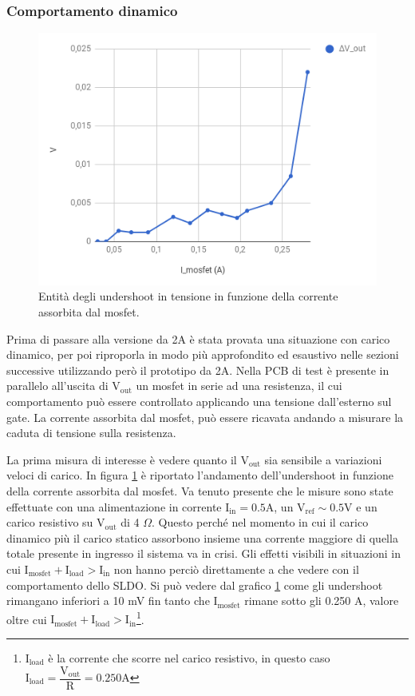 \subsubsection{Comportamento dinamico}
\begin{figure}
\centering
\includegraphics[scale=.5]{Immagini/SLDO5singlepulse}
\caption{Entità degli undershoot in tensione in funzione della corrente assorbita dal mosfet.}
\label{SLDO5singlepulse}
\end{figure}

Prima di passare alla versione da 2A è stata provata una situazione con carico dinamico, per poi riproporla in modo più approfondito ed esaustivo nelle sezioni successive utilizzando però il prototipo da 2A.
Nella PCB di test è presente in parallelo all'uscita di $\mathrm{V_{out}}$ un mosfet in serie ad una resistenza, il cui comportamento può essere controllato applicando una tensione dall'esterno sul gate. 
La corrente assorbita dal mosfet, può essere ricavata andando a misurare la caduta di tensione sulla resistenza. 

La prima misura di interesse è vedere quanto il $\mathrm{V_{out}}$ sia sensibile a variazioni veloci di carico. In figura \ref{SLDO5singlepulse} è riportato l'andamento dell'undershoot in funzione della corrente assorbita dal mosfet. Va tenuto presente che le misure sono state effettuate con una alimentazione in corrente $\mathrm{I_{in} = 0.5 A}$, un $\mathrm{V_{ref} \sim 0.5 V}$ e un carico resistivo su $\mathrm{V_{out}}$ di 4 $\Omega$. 
Questo perché nel momento in cui il carico dinamico più il carico statico assorbono insieme una corrente maggiore di quella totale presente in ingresso il sistema va in crisi. Gli effetti visibili in situazioni in cui $\mathrm{I_{mosfet} + I_{load} > I_{in}}$ non hanno perciò direttamente a che vedere con il comportamento dello SLDO. 
Si può vedere dal grafico \ref{SLDO5singlepulse} come gli undershoot rimangano inferiori a 10 mV fin tanto che $\mathrm{I_{mosfet}}$ rimane sotto gli 0.250 A, valore oltre cui $\mathrm{I_{mosfet} + I_{load} > I_{in}}$\footnote{$\mathrm{I_{load}}$ è la corrente che scorre nel carico resistivo, in questo caso $\mathrm{I_{load} = \dfrac{V_{out}}{R} = 0.250 A}$}. 

